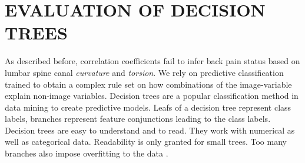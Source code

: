 \documentclass[a4paper,twoside]{style/article}
\newcommand{\com}[1]{\textcolor{orange}{\uline{#1}}}
\begin{document}
%


\section{\uppercase{Evaluation of Decision Trees}}
\label{sec:DecisionTrees}
\noindent As described before, correlation coefficients fail to infer back pain status based on lumbar spine canal \emph{curvature} and \emph{torsion}.
We rely on predictive classification trained to obtain a complex rule set on how combinations of the image-variable explain non-image variables.
Decision trees are a popular classification method in data mining to create predictive models.
Leafs of a decision tree represent class labels, branches represent feature conjunctions leading to the class labels.
Decision trees are easy to understand and to read.
They work with numerical as well as categorical data.
Readability is only granted for small trees. %
Too many branches also impose overfitting to the data \cite{DecisionTree}.
\end{document}
